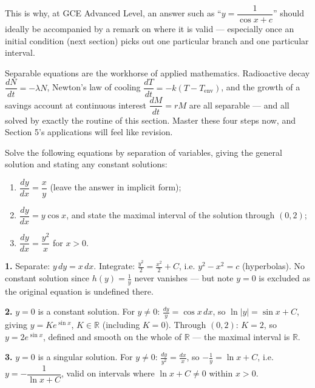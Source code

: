 \documentclass[11pt]{article}
\begin{document}
This is why, at GCE Advanced Level, an answer such as ``$y = \dfrac{1}{\cos x + c}$'' should ideally be accompanied by a remark on where it is valid — especially once an initial condition (next section) picks out one particular branch and one particular interval.

\begin{savaistu}
Separable equations are the workhorse of applied mathematics. Radioactive decay $\dfrac{dN}{dt} = -\lambda N$, Newton's law of cooling $\dfrac{dT}{dt} = -k(T - T_{\text{env}})$, and the growth of a savings account at continuous interest $\dfrac{dM}{dt} = rM$ are all separable — and all solved by exactly the routine of this section. Master these four steps now, and Section 5's applications will feel like revision.
\end{savaistu}

\begin{exercice}[Practice]
Solve the following equations by separation of variables, giving the general solution and stating any constant solutions:
\begin{enumerate}
\item $\dfrac{dy}{dx} = \dfrac{x}{y}$ \quad (leave the answer in implicit form);
\item $\dfrac{dy}{dx} = y\cos x$, and state the maximal interval of the solution through $(0, 2)$;
\item $\dfrac{dy}{dx} = \dfrac{y^{2}}{x}$ for $x > 0$.
\end{enumerate}
\end{exercice}

\begin{corrige}[Exercises 1–3]
\textbf{1.} Separate: $y\,dy = x\,dx$. Integrate: $\frac{y^{2}}{2} = \frac{x^{2}}{2} + C$, i.e. $y^{2} - x^{2} = c$ (hyperbolas). No constant solution since $h(y) = \frac{1}{y}$ never vanishes — but note $y = 0$ is excluded as the original equation is undefined there.

\textbf{2.} $y = 0$ is a constant solution. For $y \neq 0$: $\frac{dy}{y} = \cos x\,dx$, so $\ln|y| = \sin x + C$, giving $y = Ke^{\sin x}$, $K \in \mathbb{R}$ (including $K=0$). Through $(0,2)$: $K = 2$, so $y = 2e^{\sin x}$, defined and smooth on the whole of $\mathbb{R}$ — the maximal interval is $\mathbb{R}$.

\textbf{3.} $y = 0$ is a singular solution. For $y \neq 0$: $\frac{dy}{y^{2}} = \frac{dx}{x}$, so $-\frac{1}{y} = \ln x + C$, i.e. $y = -\dfrac{1}{\ln x + C}$, valid on intervals where $\ln x + C \neq 0$ within $x > 0$.
\end{corrige}
\end{document}
